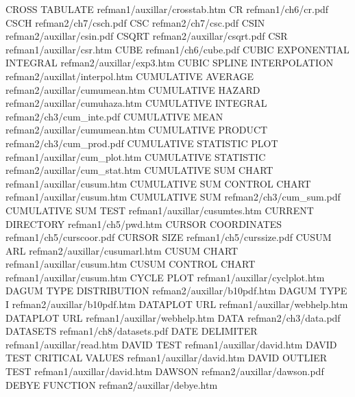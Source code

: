 CROSS TABULATE                          refman1/auxillar/crosstab.htm
CR                                      refman1/ch6/cr.pdf
CSCH                                    refman2/ch7/csch.pdf
CSC                                     refman2/ch7/csc.pdf
CSIN                                    refman2/auxillar/csin.pdf
CSQRT                                   refman2/auxillar/csqrt.pdf
CSR                                     refman1/auxillar/csr.htm
CUBE                                    refman1/ch6/cube.pdf
CUBIC EXPONENTIAL INTEGRAL              refman2/auxillar/exp3.htm
CUBIC SPLINE INTERPOLATION              refman2/auxillat/interpol.htm
CUMULATIVE AVERAGE                      refman2/auxillar/cumumean.htm
CUMULATIVE HAZARD                       refman2/auxillar/cumuhaza.htm
CUMULATIVE INTEGRAL                     refman2/ch3/cum_inte.pdf
CUMULATIVE MEAN                         refman2/auxillar/cumumean.htm
CUMULATIVE PRODUCT                      refman2/ch3/cum_prod.pdf
CUMULATIVE STATISTIC PLOT               refman1/auxillar/cum_plot.htm
CUMULATIVE STATISTIC                    refman2/auxillar/cum_stat.htm
CUMULATIVE SUM CHART                    refman1/auxillar/cusum.htm
CUMULATIVE SUM CONTROL CHART            refman1/auxillar/cusum.htm
CUMULATIVE SUM                          refman2/ch3/cum_sum.pdf
CUMULATIVE SUM TEST                     refman1/auxillar/cusumtes.htm
CURRENT DIRECTORY                       refman1/ch5/pwd.htm
CURSOR COORDINATES                      refman1/ch5/curscoor.pdf
CURSOR SIZE                             refman1/ch5/curssize.pdf
CUSUM ARL                               refman2/auxillar/cusumarl.htm
CUSUM CHART                             refman1/auxillar/cusum.htm
CUSUM CONTROL CHART                     refman1/auxillar/cusum.htm
CYCLE PLOT                              refman1/auxillar/cyclplot.htm
DAGUM TYPE DISTRIBUTION                 refman2/auxillar/b10pdf.htm
DAGUM TYPE I                            refman2/auxillar/b10pdf.htm
DATAPLOT URL                            refman1/auxillar/webhelp.htm
DATAPLOT URL                            refman1/auxillar/webhelp.htm
DATA                                    refman2/ch3/data.pdf
DATASETS                                refman1/ch8/datasets.pdf
DATE DELIMITER                          refman1/auxillar/read.htm
DAVID TEST                              refman1/auxillar/david.htm
DAVID TEST CRITICAL VALUES              refman1/auxillar/david.htm
DAVID OUTLIER TEST                      refman1/auxillar/david.htm
DAWSON                                  refman2/auxillar/dawson.pdf
DEBYE FUNCTION                          refman2/auxillar/debye.htm
